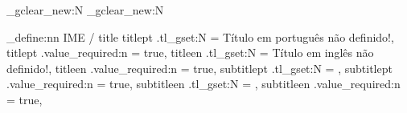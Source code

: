 \seq_gclear_new:N \@seqkeywordspt
\seq_gclear_new:N \@seqkeywordsen
\newcommand*{\palavrachave}[1]{\seq_gput_right:Nn \@seqkeywordspt {#1}}
\newcommand*{\keyword}[1]{\seq_gput_right:Nn \@seqkeywordsen {#1}}

\newcommand*{\@keywordspt}{\seq_use:Nn \@seqkeywordspt {.\space}.}
\newcommand*{\@keywordsen}{\seq_use:Nn \@seqkeywordsen {.\space}.}

\newcommand*{\@commakeywordspt}{\seq_use:Nn \@seqkeywordspt {,}}
\newcommand*{\@commakeywordsen}{\seq_use:Nn \@seqkeywordsen {,}}

\ExplSyntaxOff




\providecommand\@author{Autor não definido!}
\providecommand\@program{Programa não definido!}
\providecommand\@financing{}
\providecommand\@defenselocation{Local não definido!}
\providecommand\@license{Direitos não definidos!}
\providecommand\@title{Título não definido!}
\providecommand\@titlept{Título em português não definido!}
\providecommand\@titleen{Título em inglês não definido!}
\providecommand\@resumo{Resumo não definido!}
\providecommand\@abstract{Abstract não definido!}



\ExplSyntaxOn

\keys_define:nn { IME / title }
  {
    titlept .tl_gset:N = \@titlept,
    titlept .value_required:n = true,
    titleen .tl_gset:N = \@titleen,
    titleen .value_required:n = true,
    subtitlept .tl_gset:N = \@subtitlept,
    subtitlept .value_required:n = true,
    subtitleen .tl_gset:N = \@subtitleen,
    subtitleen .value_required:n = true,
  }

